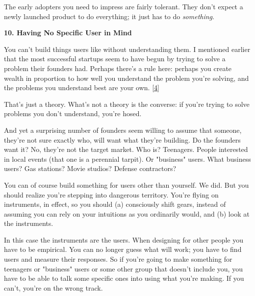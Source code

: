 The early adopters you need to
                    impress are fairly tolerant. They don't expect a newly
                    launched product to do everything; it just has to do
                    \emph{something}.

\textbf{10. Having No Specific User in Mind}

You can't build things users like without
                    understanding them. I mentioned earlier that the most
                    successful startups seem to have begun by trying to solve a
                    problem their founders had. Perhaps there's a rule here:
                    perhaps you create wealth in proportion to how well you
                    understand the problem you're solving, and the problems you
                    understand best are your own.
                    [\href{\#f4n}{4}]

That's just a theory. What's not a theory is
                    the converse: if you're trying to solve problems you don't
                    understand, you're hosed.

And yet a surprising
                    number of founders seem willing to assume that someone,
                    they're not sure exactly who, will want what they're
                    building. Do the founders want it? No, they're not the
                    target market. Who is? Teenagers. People interested in local
                    events (that one is a perennial tarpit). Or "business"
                    users. What business users? Gas stations? Movie studios?
                    Defense contractors?

You can of course build
                    something for users other than yourself. We did. But you
                    should realize you're stepping into dangerous territory.
                    You're flying on instruments, in effect, so you should (a)
                    consciously shift gears, instead of assuming you can rely on
                    your intuitions as you ordinarily would, and (b) look at the
                    instruments.

In this case the instruments are the
                    users. When designing for other people you have to be
                    empirical. You can no longer guess what will work; you have
                    to find users and measure their responses. So if you're
                    going to make something for teenagers or "business" users or
                    some other group that doesn't include you, you have to be
                    able to talk some specific ones into using what you're
                    making. If you can't, you're on the wrong track.

